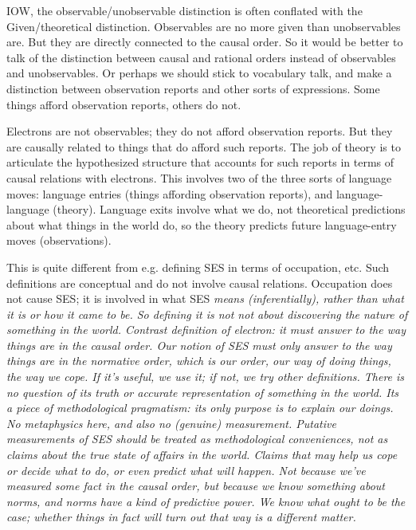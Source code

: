 \documentclass[11pt,twoside]{article}
\begin{document}
IOW, the observable/unobservable distinction is often conflated with
the Given/theoretical distinction.  Observables are no more given than
unobservables are.  But they are directly connected to the causal
order.  So it would be better to talk of the distinction between
causal and rational orders instead of observables and unobservables.
Or perhaps we should stick to vocabulary talk, and make a distinction
between observation reports and other sorts of expressions.  Some
things afford observation reports, others do not.

Electrons are not observables; they do not afford observation reports.
But they are causally related to things that do afford such reports.
The job of theory is to articulate the hypothesized structure that
accounts for such reports in terms of causal relations with electrons.
This involves two of the three sorts of language moves: language
entries (things affording observation reports), and language-language
(theory).  Language exits involve what we do, not theoretical
predictions about what things in the world do, so the theory predicts
future language-entry moves (observations).

This is quite different from e.g. defining SES in terms of occupation,
etc.  Such definitions are conceptual and do not involve causal
relations.  Occupation does not cause SES; it is involved in what SES
\it{means} (inferentially), rather than what it is or how it came to
be.  So defining it is not not about discovering the nature of
something in the world.  Contrast definition of electron: it must
answer to the way things are in the causal order.  Our notion of SES
must only answer to the way things are in the normative order, which
is our order, our way of doing things, the way we cope.  If it's
useful, we use it; if not, we try other definitions.  There is no
question of its truth or accurate representation of something in the
world.  Its a piece of methodological pragmatism: its only purpose is
to explain our doings.  No metaphysics here, and also no (genuine)
measurement.  Putative measurements of SES should be treated as
methodological conveniences, not as claims about the true state of
affairs in the world.  Claims that may help us cope or decide what to
do, or even predict what will happen.  Not because we've measured some
fact in the causal order, but because we know something about norms,
and norms have a kind of predictive power.  We know what ought to be
the case; whether things in fact will turn out that way is a different
matter.
\end{document}
